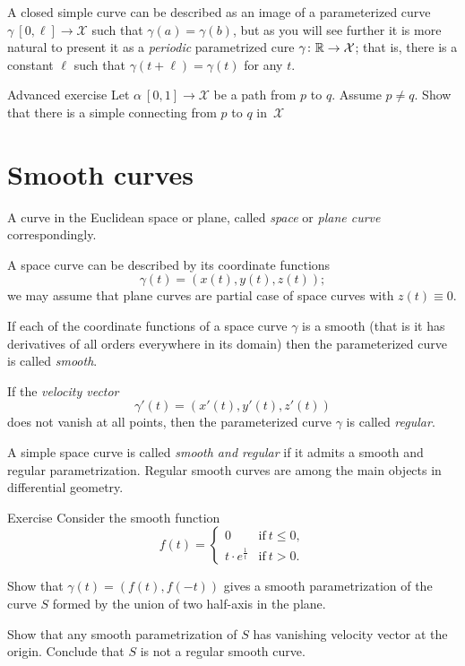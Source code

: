 A closed simple curve can be described as an image of a parameterized curve $\gamma\: [0,\ell]\to \mathcal{X}$ such that $\gamma(a)=\gamma(b)$,
but as you will see further it is more natural to present it as a \emph{periodic} parametrized cure $\gamma\colon \mathbb{R}\to \mathcal{X}$; that is, there is a constant $\ell$ such that $\gamma(t+\ell)=\gamma(t)$ for any $t$.

\begin{thm}{Advanced exercise}
Let $\alpha\:[0,1]\to\mathcal{X}$ be a path from $p$ to $q$.
Assume $p\ne q$.
Show that there is a simple connecting from $p$ to $q$ in~$\mathcal{X}$
\end{thm}

\section*{Smooth curves}

A curve in the Euclidean space or plane, called \emph{space} or \emph{plane curve} correspondingly.

A space curve can be described by its coordinate functions 
\[\gamma(t)=(x(t),y(t),z(t));\]
we may assume that plane curves are partial case of space curves with $z(t)\equiv 0$.

If each of the coordinate functions of a space curve $\gamma$ is a smooth (that is it has derivatives of all orders everywhere in its domain) then the parameterized curve is called \emph{smooth}.

If the \emph{velocity vector} 
\[\gamma'(t)=(x'(t),y'(t),z'(t))\] 
does not vanish at all points, then the parameterized curve $\gamma$ is called \emph{regular}.

A simple space curve is called \emph{smooth and regular} if it admits a smooth and regular parametrization.
Regular smooth curves are among the main objects in differential geometry.

\begin{thm}{Exercise}\label{ex:L-shape}
Consider the smooth function 
\[f(t)=
\begin{cases}
0&\text{if}\ t\le 0,
\\
t\cdot e^{\frac1t}&\text{if}\ t> 0.
\end{cases}
\]

Show that $\gamma(t)=(f(t),f(-t))$ gives a smooth parametrization of the curve $S$ formed by the union of two half-axis in the plane.

Show that any smooth parametrization of $S$ has vanishing velocity vector at the origin.
Conclude that $S$ is not a regular smooth curve.
\end{thm}


